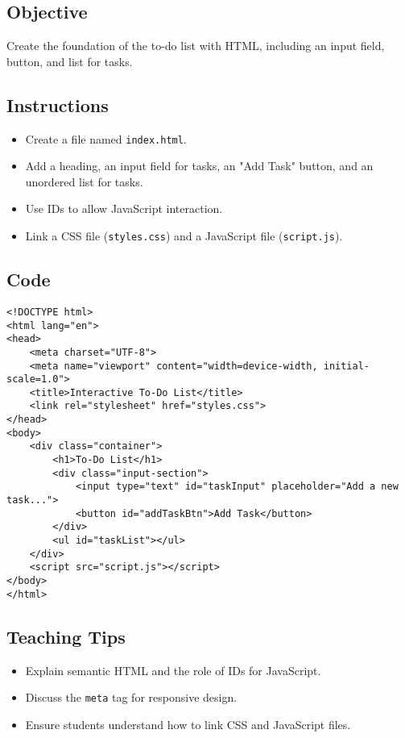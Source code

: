 \documentclass[a4paper,12pt]{article}
\begin{document}
\subsection{Objective}
Create the foundation of the to-do list with HTML, including an input field, button, and list for tasks.

\subsection{Instructions}
\begin{itemize}
    \item Create a file named \texttt{index.html}.
    \item Add a heading, an input field for tasks, an "Add Task" button, and an unordered list for tasks.
    \item Use IDs to allow JavaScript interaction.
    \item Link a CSS file (\texttt{styles.css}) and a JavaScript file (\texttt{script.js}).
\end{itemize}

\subsection{Code}
\lstset{language=HTML}
\begin{lstlisting}
<!DOCTYPE html>
<html lang="en">
<head>
    <meta charset="UTF-8">
    <meta name="viewport" content="width=device-width, initial-scale=1.0">
    <title>Interactive To-Do List</title>
    <link rel="stylesheet" href="styles.css">
</head>
<body>
    <div class="container">
        <h1>To-Do List</h1>
        <div class="input-section">
            <input type="text" id="taskInput" placeholder="Add a new task...">
            <button id="addTaskBtn">Add Task</button>
        </div>
        <ul id="taskList"></ul>
    </div>
    <script src="script.js"></script>
</body>
</html>
\end{lstlisting}

\subsection{Teaching Tips}
\begin{itemize}
    \item Explain semantic HTML and the role of IDs for JavaScript.
    \item Discuss the \texttt{meta} tag for responsive design.
    \item Ensure students understand how to link CSS and JavaScript files.
\end{itemize}
\end{document}
